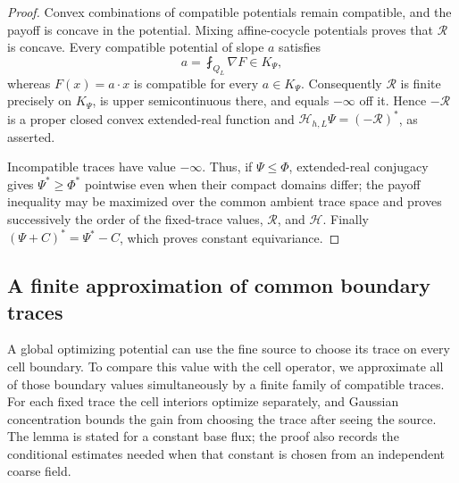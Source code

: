 \documentclass{aomart}
\theoremstyle{definition}
\newcommand{\1}{\mathbf 1}
\begin{document}
\begin{proof}
Convex combinations of compatible potentials remain compatible, and
the payoff is concave in the potential.  Mixing affine-cocycle
potentials proves that $\mathcal R$ is concave.  Every compatible potential of
slope $a$ satisfies
\begin{equation*}
a=\fint_ {Q_ L}\nabla F\in K_ \Psi,
\end{equation*}
whereas $F(x)=a\cdot x$ is compatible for every $a\in K_ \Psi$.
Consequently $\mathcal R$ is finite precisely on $K_ \Psi$, is
upper semicontinuous there, and equals $-\infty$ off it.  Hence
$-\mathcal R$ is a proper closed convex extended-real function and
$\mathcal H_ {h,L}\Psi=(-\mathcal R)^*$, as asserted.

Incompatible traces have value $-\infty$.  Thus, if
$\Psi\leq\Phi$, extended-real conjugacy gives
$\Psi^*\geq\Phi^*$ pointwise even when their compact domains differ;
the payoff inequality may be maximized over the common ambient trace
space and proves successively the order of the fixed-trace values,
$\mathcal R$, and $\mathcal H$.  Finally
$(\Psi+C)^*=\Psi^*-C$, which proves constant equivariance.

\end{proof}

\subsection{A finite approximation of common boundary traces}

A global optimizing potential can use the fine source to choose its trace
on every cell boundary.  To compare this value with the cell operator,
we approximate all of those boundary values simultaneously by a finite
family of compatible traces.  For each fixed trace the cell interiors
optimize separately, and Gaussian concentration bounds the gain from
choosing the trace after seeing the source.  The lemma is stated for a
constant base flux; the proof also records the conditional estimates
needed when that constant is chosen from an independent coarse field.
\end{document}
